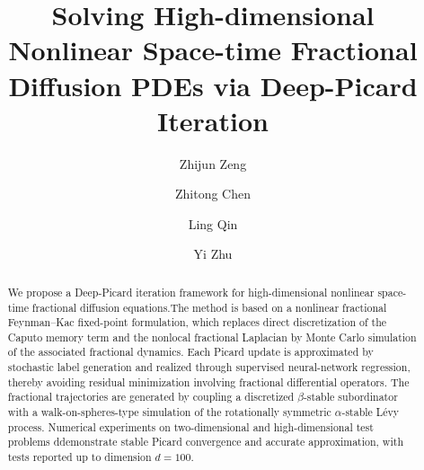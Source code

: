 \documentclass[a4paper,fleqn]{cas-sc}
\begin{document}
\let\WriteBookmarks\relax
\def\floatpagepagefraction{1}
\def\textpagefraction{.001}


\title[mode=title]{Solving High-dimensional Nonlinear Space-time Fractional Diffusion PDEs via Deep-Picard Iteration}

\author[1]{Zhijun Zeng}
\author[1]{Zhitong Chen}
\cormark[1]
\author[2,3]{Ling Qin}
\author[3,4]{Yi Zhu}
\cormark[2]



\begin{abstract}
We propose a Deep-Picard iteration framework for high-dimensional nonlinear
space-time fractional diffusion equations.The method is based on a nonlinear fractional
Feynman--Kac fixed-point formulation, which replaces direct discretization of
the Caputo memory term and the nonlocal fractional Laplacian by Monte Carlo
simulation of the associated fractional dynamics. Each Picard update is
approximated by stochastic label generation and realized through supervised
neural-network regression, thereby avoiding residual minimization involving
fractional differential operators. The fractional trajectories are generated by
coupling a discretized $\beta$-stable subordinator with a walk-on-spheres-type
simulation of the rotationally symmetric $\alpha$-stable L\'evy process. Numerical experiments on two-dimensional and high-dimensional
test problems ddemonstrate stable Picard convergence and accurate approximation, with tests
reported up to dimension $d=100$.
\end{abstract}
\end{document}

